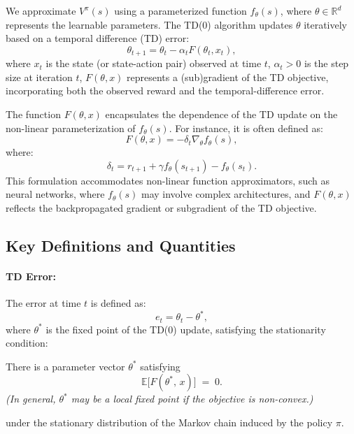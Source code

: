 \noindent
We approximate \(V^\pi(s)\) using a parameterized function \(f_\theta(s)\), where \(\theta \in \mathbb{R}^d\) represents the learnable parameters. The TD(0) algorithm updates \(\theta\) iteratively based on a temporal difference (TD) error:
\begin{equation}\label{eq:td(0)}
    \theta_{t+1} = \theta_t - \alpha_t F(\theta_t, x_t),
\end{equation}
where \(x_t\) is the state (or state-action pair) observed at time \(t\), \(\alpha_t > 0\) is the step size at iteration \(t\), \(F(\theta, x)\) represents a (sub)gradient of the TD objective, incorporating both the observed reward and the temporal-difference error.

The function \(F(\theta, x)\) encapsulates the dependence of the TD update on the non-linear parameterization of \(f_\theta(s)\). For instance, it is often defined as:
\begin{equation}\label{def:F}
    F(\theta, x) = -\delta_t \nabla_\theta f_\theta(s),
\end{equation}
where:
\begin{equation}\label{def:delta}
\delta_t = r_{t+1} + \gamma f_\theta(s_{t+1}) - f_\theta(s_t).    
\end{equation}
\noindent
This formulation accommodates non-linear function approximators, such as neural networks, where \(f_\theta(s)\) may involve complex architectures, and \(F(\theta, x)\) reflects the backpropagated gradient or subgradient of the TD objective.

\subsection{Key Definitions and Quantities}

\paragraph{TD Error:} The error at time \(t\) is defined as:
\[
e_t = \theta_t - \theta^*,
\]
where \(\theta^*\) is the fixed point of the TD(0) update, satisfying the stationarity condition:
\begin{assumption}
\label{ass:stationary-solution}
There is a parameter vector \(\theta^*\) satisfying
\[
    \mathbb{E}\bigl[F(\theta^*,\,x)\bigr] \;=\; 0.
\]
\textit{(In general, \(\theta^*\) may be a local fixed point if the objective is non-convex.)}
\end{assumption}
under the stationary distribution of the Markov chain induced by the policy \(\pi\).

